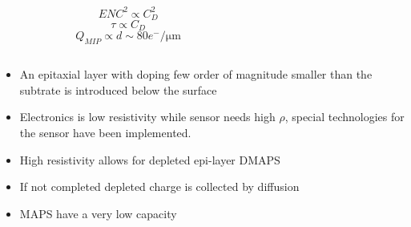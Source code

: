 \begin{frame}
\begin{columns}
\begin{equation*}
                    \hspace{80pt} ENC^2 \propto C_D ^2
                \end{equation*}  
                \begin{equation*}
                    \hspace{80pt} \tau \propto C_D
                \end{equation*}  
                \begin{equation*}
                    \hspace{80pt} Q_{MIP}\propto d \sim 80 e^-/\si{\um}
                \end{equation*}  
            \end{columns}   
        \medskip 
        \begin{itemize}
            \item An epitaxial layer with doping few order of magnitude smaller than the subtrate is introduced below the surface
            \item Electronics is low resistivity while sensor needs high $\rho$, special technologies for the sensor have been implemented. 
            \item High resistivity allows for depleted epi-layer DMAPS
            \item If not completed depleted charge is collected by diffusion
            \item MAPS have a very low capacity 
        \end{itemize}
    \end{frame} 



